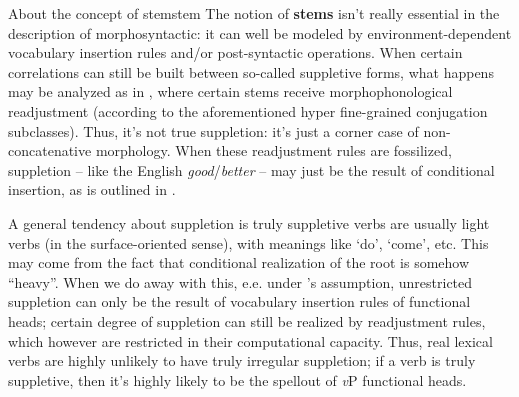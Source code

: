 \documentclass[UTF8, a4paper, oneside]{report}
\newcommand*{\concept}[1]{\textbf{#1}}
\newcommand{\corpus}[1]{\emph{#1}}
\newcommand{\translate}[1]{`#1'}
\newcommand{\vP}{\textit{v}P}
\begin{document}
\begin{theorybox}{About the concept of stem}{stem}
    The notion of \concept{stems} isn't really essential in the description of morphosyntactic:
    it can well be modeled by environment-dependent vocabulary insertion rules 
    and/or post-syntactic operations.
    When certain correlations can still be built between so-called suppletive forms,
    what happens may be analyzed as in \citet{embick2005status},
    where certain stems receive morphophonological readjustment
    (according to the aforementioned hyper fine-grained conjugation subclasses).
    Thus, it's not true suppletion:
    it's just a corner case of non-concatenative morphology.
    When these readjustment rules are fossilized,
    suppletion -- like the English \corpus{good}/\corpus{better} -- 
    may just be the result of conditional insertion,
    as is outlined in \citet{siddiqi2009syntax}.

    A general tendency about suppletion
    is truly suppletive verbs are usually light verbs 
    (in the surface-oriented sense),
    with meanings like \translate{do}, \translate{come}, etc.
    This may come from the fact that conditional realization of the root 
    is somehow ``heavy''.
    When we do away with this,
    e.e. under \citet{embick2005status}'s assumption,
    unrestricted suppletion can only be the result of 
    vocabulary insertion rules of functional heads;
    certain degree of suppletion can still be realized by readjustment rules,
    which however are restricted in their computational capacity.
    Thus, real lexical verbs are highly unlikely to have truly irregular suppletion;
    if a verb is truly suppletive,
    then it's highly likely to be 
    the spellout of \vP{} functional heads.
\end{theorybox}
\end{document}
